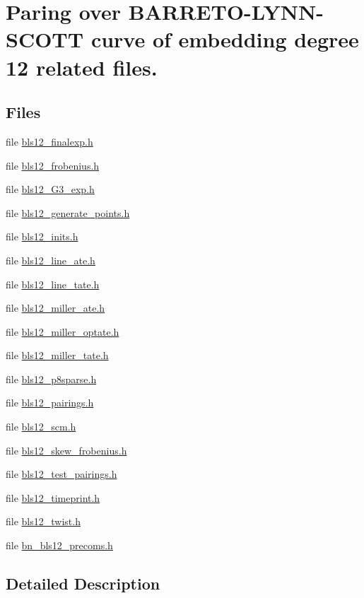 \hypertarget{group__bls12}{}\section{Paring over B\+A\+R\+R\+E\+T\+O-\/\+L\+Y\+N\+N-\/\+S\+C\+O\+TT curve of embedding degree 12 related files.}
\label{group__bls12}
\subsection*{Files}
\begin{DoxyCompactItemize}
\item 
file \hyperlink{bls12__finalexp_8h}{bls12\+\_\+finalexp.\+h}
\item 
file \hyperlink{bls12__frobenius_8h}{bls12\+\_\+frobenius.\+h}
\item 
file \hyperlink{bls12___g3__exp_8h}{bls12\+\_\+\+G3\+\_\+exp.\+h}
\item 
file \hyperlink{bls12__generate__points_8h}{bls12\+\_\+generate\+\_\+points.\+h}
\item 
file \hyperlink{bls12__inits_8h}{bls12\+\_\+inits.\+h}
\item 
file \hyperlink{bls12__line__ate_8h}{bls12\+\_\+line\+\_\+ate.\+h}
\item 
file \hyperlink{bls12__line__tate_8h}{bls12\+\_\+line\+\_\+tate.\+h}
\item 
file \hyperlink{bls12__miller__ate_8h}{bls12\+\_\+miller\+\_\+ate.\+h}
\item 
file \hyperlink{bls12__miller__optate_8h}{bls12\+\_\+miller\+\_\+optate.\+h}
\item 
file \hyperlink{bls12__miller__tate_8h}{bls12\+\_\+miller\+\_\+tate.\+h}
\item 
file \hyperlink{bls12__p8sparse_8h}{bls12\+\_\+p8sparse.\+h}
\item 
file \hyperlink{bls12__pairings_8h}{bls12\+\_\+pairings.\+h}
\item 
file \hyperlink{bls12__scm_8h}{bls12\+\_\+scm.\+h}
\item 
file \hyperlink{bls12__skew__frobenius_8h}{bls12\+\_\+skew\+\_\+frobenius.\+h}
\item 
file \hyperlink{bls12__test__pairings_8h}{bls12\+\_\+test\+\_\+pairings.\+h}
\item 
file \hyperlink{bls12__timeprint_8h}{bls12\+\_\+timeprint.\+h}
\item 
file \hyperlink{bls12__twist_8h}{bls12\+\_\+twist.\+h}
\item 
file \hyperlink{bn__bls12__precoms_8h}{bn\+\_\+bls12\+\_\+precoms.\+h}
\end{DoxyCompactItemize}


\subsection{Detailed Description}
